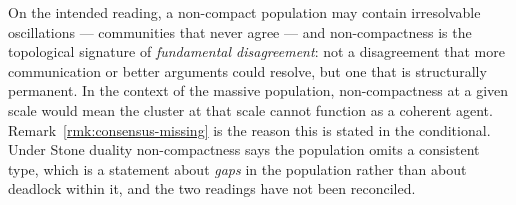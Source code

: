 \begin{remark}
On the intended reading, a non-compact population may contain
irresolvable oscillations --- communities that never agree ---
and non-compactness is the topological signature of
\emph{fundamental disagreement}: not a disagreement that more
communication or better arguments could resolve, but one that is
structurally permanent.
In the context of the massive population, non-compactness at a given
scale would mean the cluster at that scale cannot function as a
coherent agent.
Remark~\ref{rmk:consensus-missing} is the reason this is stated in the
conditional.
Under Stone duality non-compactness says the population omits a
consistent type, which is a statement about \emph{gaps} in the
population rather than about deadlock within it, and the two readings
have not been reconciled.
\end{remark}

